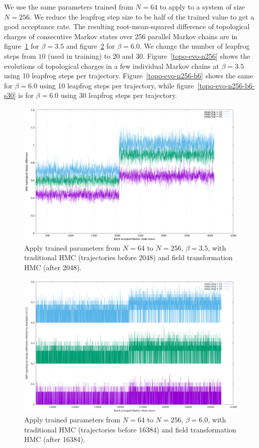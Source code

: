 We use the same parameters trained from $N=64$ to apply to a system of size $N=256$.
We reduce the leapfrog step size to be half of the trained value to get a good acceptance rate.
The resulting root-mean-squared difference of topological charges of consecutive Markov states
over 256 parallel Markov chains are in figure~\ref{topo-diff-n256} for $β=3.5$ and
figure~\ref{topo-diff-n256-b6} for $β=6.0$.
We change the number of leapfrog steps from $10$ (used in training) to $20$ and $30$.
Figure~\ref{topo-evo-n256} shows the evolutions of topological charges in
a few individual Markov chains at $β=3.5$ using 10 leapfrog steps per trajectory.
Figure~\ref{topo-evo-n256-b6} shows the same for $β=6.0$ using 10 leapfrog steps per trajectory,
while figure~\ref{topo-evo-n256-b6-s30} is for $β=6.0$ using 30 leapfrog steps per trajectory.

\begin{figure}
	\centering
	\includegraphics[width=\textwidth]{../topodiffN256.png}
	\caption{\label{topo-diff-n256}Apply trained parameters from $N=64$ to $N=256$, $β=3.5$,
		with traditional HMC (trajectories before 2048)
		and field transformation HMC (after 2048).}
\end{figure}

\begin{figure}
	\centering
	\includegraphics[width=\textwidth]{../topodiffN256_b6.png}
	\caption{\label{topo-diff-n256-b6}Apply trained parameters from $N=64$ to $N=256$, $β=6.0$,
		with traditional HMC (trajectories before 16384)
		and field transformation HMC (after 16384).}
\end{figure}

